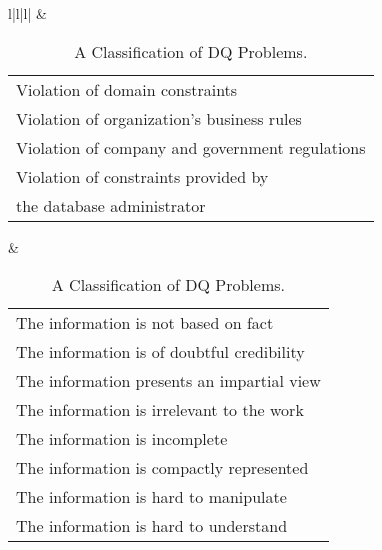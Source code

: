 \documentclass[pdftex,english,oribibl]{llncs}
\begin{document}
\begin{table}[]
\begin{tabular}{l|l|l|}
   & \begin{tabular}[c]{@{}l@{}}Violation of domain constraints \\ Violation of organization’s business rules\\ Violation of company and government regulations \\ Violation of constraints provided by\\  the database administrator\end{tabular}                                & \begin{tabular}[c]{@{}l@{}}The information is not based on fact \\ The information is of doubtful credibility\\ The information presents an impartial view\\ The information is irrelevant to the work\\ The information is incomplete\\ The information is compactly represented\\ The information is hard to manipulate \\ The information is hard to understand\end{tabular} \\ \hline
\end{tabular}
\caption{A Classification of DQ Problems.}
\label{table:classificationdataqualityproblem}
\end{table}
\end{document}

